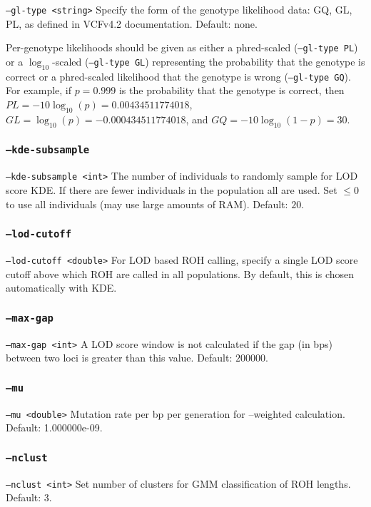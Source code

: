 \documentclass[12pt]{article}%
\begin{document}
{\tt --gl-type <string>} Specify the form of the genotype likelihood data: GQ, GL, PL, as defined in VCFv4.2 documentation. Default: none.

Per-genotype likelihoods should be given as either a phred-scaled ({\tt --gl-type PL}) or a $\log_{10}$-scaled ({\tt --gl-type GL}) representing the probability that the genotype is correct or a phred-scaled likelihood that the genotype is wrong ({\tt --gl-type GQ}).  For example, if $p = 0.999$ is the probability that the genotype is correct, then $PL = -10\log_{10}(p) = 0.00434511774018$, $GL = \log_{10}(p) = -0.000434511774018$, and $GQ = -10\log_{10}(1-p) = 30$.

\subsubsection{{\tt --kde-subsample}}

{\tt --kde-subsample <int>} The number of individuals to randomly sample for LOD score KDE. If there are fewer individuals in the population all are used. Set $\le 0$ to use all individuals (may use large amounts of RAM). Default: $20$.

\subsubsection{{\tt --lod-cutoff}}
{\tt --lod-cutoff <double>} For LOD based ROH calling, specify a single LOD score cutoff above which ROH are called in all populations.  By default, this is chosen automatically with KDE.

\subsubsection{{\tt --max-gap}}
{\tt --max-gap <int>} A LOD score window is not calculated if the gap (in bps) between two loci is greater than this value. Default: $200000$.

\subsubsection{{\tt --mu}}
{\tt --mu <double>} Mutation rate per bp per generation for --weighted calculation. Default: 1.000000e-09.

\subsubsection{{\tt --nclust}}
{\tt --nclust <int>} Set number of clusters for GMM classification of ROH lengths. Default: 3.
\end{document}
